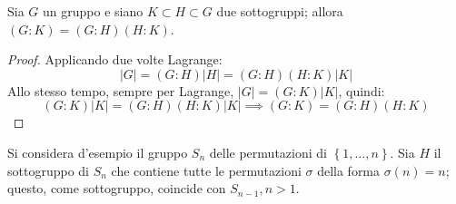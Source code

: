 \documentclass[11pt, a4paper]{scrartcl}
\theoremstyle{definition}
\numberwithin{esempio}{section}
\theoremstyle{definition}
\numberwithin{obs}{section}
\numberwithin{nota}{section}
\numberwithin{equation}{subsection}
\begin{document}
\begin{corollario}
	{}{}
	Sia $G$ un gruppo e siano $K \subset H \subset G$ due sottogruppi; allora $(G:K) = (G:H)(H:K)$.
	\begin{proof}
Applicando due volte Lagrange:
\[
|G| = (G:H) |H| = (G:H) (H:K) |K|
\] 
Allo stesso tempo, sempre per Lagrange, $|G| = (G:K) |K|$, quindi:
\[
(G:K) |K| = (G:H)(H:K)|K|\implies (G:K)= (G:H)(H:K)
\] 
	\end{proof}
\end{corollario}

Si considera d'esempio il gruppo $S_n$ delle permutazioni di $\left\{ 1, \ldots , n \right\} $. 
Sia $H$ il sottogruppo di $S_n$ che contiene tutte le permutazioni $\sigma $ della forma $\sigma (n) = n $; questo, come sottogruppo, coincide con $S_{n-1} , n > 1$.
\end{document}
